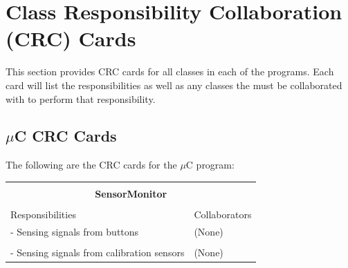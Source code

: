 \documentclass[titlepage]{article}
\begin{document}
\section{Class Responsibility Collaboration (CRC) Cards}
This section provides CRC cards for all classes in each of the programs. Each card will list the responsibilities as well as any classes the must be collaborated with to perform that responsibility.
\subsection{$\mu$C CRC Cards}
The following are the CRC cards for the $\mu$C program:\\
\begin{table}[!htbp]
\centering
\begin{tabular}{| p{} | p{} |}\hline
	\multicolumn{2}{|l|}{}\\
	\multicolumn{2}{|c|}{\large{\textbf{SensorMonitor}}}\\
	\multicolumn{2}{|l|}{}\\\hline
	\vspace{0mm}\large{Responsibilities}\vspace{2mm} &\vspace{0mm}\large{Collaborators}\vspace{2mm}\\\hline
	\vspace{0mm}- Sensing signals from buttons	&\vspace{0mm}(None)\\&\\
	- Sensing signals from calibration sensors\vspace{2mm}	&(None)\vspace{2mm}\\\hline
\end{tabular}
\end{table}
\end{document}
